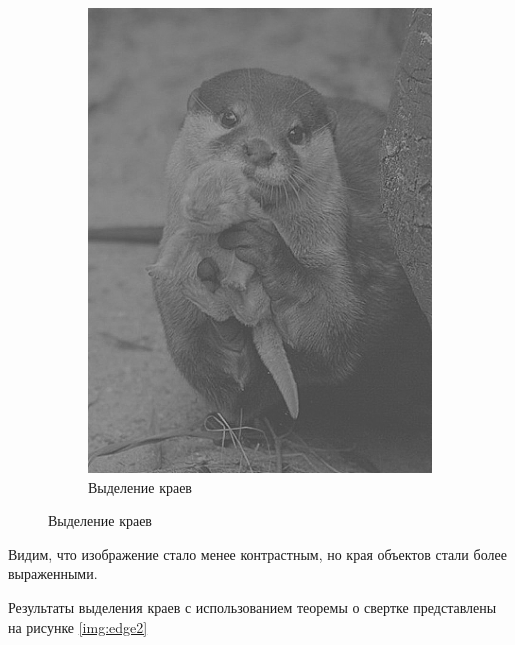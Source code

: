 \begin{figure}[ht!]
\begin{subfigure}[b]{0.5\linewidth}
        \includegraphics[width=0.95\linewidth]{edge_x.png}
        \caption{Выделение краев}
    \end{subfigure}
    \caption{Выделение краев}
    \label{img:edge}
\end{figure}

Видим, что изображение стало менее контрастным, но края объектов стали более выраженными.

Результаты выделения краев с использованием теоремы о свертке представлены на рисунке \ref{img:edge2}

